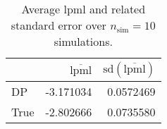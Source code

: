 \begin{table}[H]

\caption{Average lpml and related standard error over $n_{\text{sim}} = 10$ simulations.}
\centering
\begin{tabular}[t]{lrr}
\toprule
  & $\overbar{\text{lpml}}$ & $\text{sd}(\overbar{\text{lpml}})$\\
\midrule
DP & -3.171034 & 0.0572469\\
True & -2.802666 & 0.0735580\\
\bottomrule
\end{tabular}
\end{table}